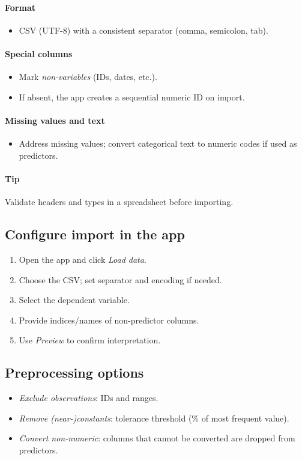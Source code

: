 \documentclass[12pt,a4paper]{article}
\begin{document}
\paragraph{Format}
\begin{itemize}
  \item CSV (UTF-8) with a consistent separator (comma, semicolon, tab).
\end{itemize}
\paragraph{Special columns}
\begin{itemize}
  \item Mark \emph{non-variables} (IDs, dates, etc.).
  \item If absent, the app creates a sequential numeric ID on import.
\end{itemize}
\paragraph{Missing values and text}
\begin{itemize}
  \item Address missing values; convert categorical text to numeric codes if used as predictors.
\end{itemize}
\paragraph{Tip} Validate headers and types in a spreadsheet before importing.

\subsection{Configure import in the app}
\begin{enumerate}
  \item Open the app and click \emph{Load data}.
  \item Choose the CSV; set separator and encoding if needed.
  \item Select the dependent variable.
  \item Provide indices/names of non-predictor columns.
  \item Use \emph{Preview} to confirm interpretation.
\end{enumerate}

\subsection{Preprocessing options}
\begin{itemize}
  \item \emph{Exclude observations}: IDs and ranges.
  \item \emph{Remove (near-)constants}: tolerance threshold (\% of most frequent value).
  \item \emph{Convert non-numeric}: columns that cannot be converted are dropped from predictors.
\end{itemize}
\end{document}
